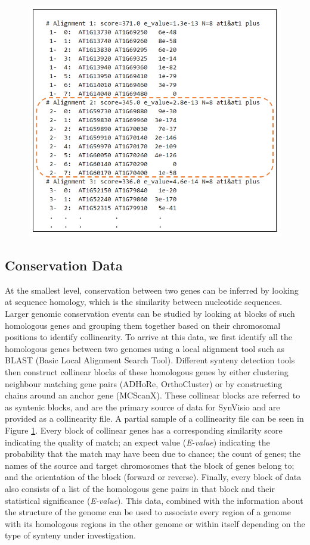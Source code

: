 \begin{figure}
  \centering
  \includegraphics[width=.675\linewidth]{images/ch_3_coll_file.PNG}
  \label{fig:ch_3_coll_file}
\end{figure}



\subsection{Conservation Data}
At the smallest level, conservation between two genes can be inferred by looking at sequence homology, which is the similarity between nucleotide sequences. Larger genomic conservation events can be studied by looking at blocks of such homologous genes and grouping them together based on their chromosomal positions to identify collinearity. To arrive at this data, we first identify all the homologous genes between two genomes using a local alignment tool such as BLAST (Basic Local Alignment Search Tool)\cite{blasttool}. Different synteny detection tools then construct collinear blocks of these homologous genes by either clustering neighbour matching gene pairs (ADHoRe, OrthoCluster) \cite{proost2011adhore,zeng2008orthocluster} or by constructing chains around an anchor gene (MCScanX)\cite{wang2012mcscanx}. These collinear blocks are referred to as syntenic blocks, and are the primary source of data for SynVisio and are provided as a collinearity file. A partial sample of a collinearity file can be seen in Figure \ref{fig:ch_3_coll_file}. Every block of collinear genes has a corresponding similarity score indicating the quality of match; an expect value (\textit{E-value}) indicating the probability that the match may have been due to chance; the count of genes; the names of the source and target chromosomes that the block of genes belong to; and the orientation of the block (forward or reverse). Finally, every block of data also consists of a list of the homologous gene pairs in that block and their statistical significance (\textit{E-value}). This data, combined with the information about the structure of the genome can be used to associate every region of a genome with its homologous regions in the other genome or within itself depending on the type of synteny under investigation.


